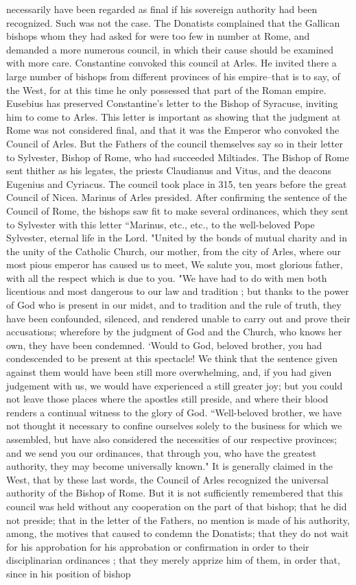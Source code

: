 necessarily have been regarded as final if his sovereign authority had been recognized. Such was not the case. The Donatists complained that the Gallican bishops whom they had asked for were too few in number at Rome, and demanded a more numerous council, in which their cause should be examined with more care. Constantine convoked this council at Arles. He invited there a large number of bishops from different provinces of his empire--that is to say, of the West, for at this time he only possessed that part of the Roman empire. Eusebius has preserved Constantine's letter to the Bishop of Syracuse, inviting him to come to Arles. This letter is important as showing that the judgment at Rome was not considered final, and that it was the Emperor who convoked the Council of Arles. But the Fathers of the council themselves say so in their letter to Sylvester, Bishop of Rome, who had succeeded Miltiades. The Bishop of Rome sent thither as his legates, the priests Claudianus and Vitus, and the deacons Eugenius and Cyriacus. The council took place in 315, ten years before the great Council of Nicea. Marinus of Arles presided. After confirming the sentence of the Council of Rome, the bishops saw fit to make several ordinances, which they sent to Sylvester with this letter “Marinus, etc., etc., to the well-beloved Pope Sylvester, eternal life in the Lord. "United by the bonds of mutual charity and in the unity of the Catholic Church, our mother, from the city of Arles, where our most pious emperor has caused us to meet, We salute you, most glorious father, with all the respect which is due to you. "We have had to do with men both licentious and most dangerous to our law and tradition ; but thanks to the power of God who is present in our midst, and to tradition and the rule of truth, they have been confounded, silenced, and rendered unable to carry out and prove their accusations; wherefore by the judgment of God and the Church, who knows her own, they have been condemned. ‘Would to God, beloved brother, you had condescended to be present at this spectacle! We think that the sentence given against them would have been still more overwhelming, and, if you had given judgement with us, we would have experienced a still greater joy; but you could not leave those places where the apostles still preside, and where their blood renders a continual witness to the glory of God. “Well-beloved brother, we have not thought it necessary to confine ourselves solely to the business for which we assembled, but have also considered the necessities of our respective provinces; and we send you our ordinances, that through you, who have the greatest authority, they may become universally known." It is generally claimed in the West, that by these last words, the Council of Arles recognized the universal authority of the Bishop of Rome. But it is not sufficiently remembered that this council was held without any cooperation on the part of that bishop; that he did not preside; that in the letter of the Fathers, no mention is made of his authority, among, the motives that caused to condemn the Donatists; that they do not wait for his approbation for his approbation or confirmation in order to their disciplinarian ordinances ; that they merely apprize him of them, in order that, since in his position of bishop 